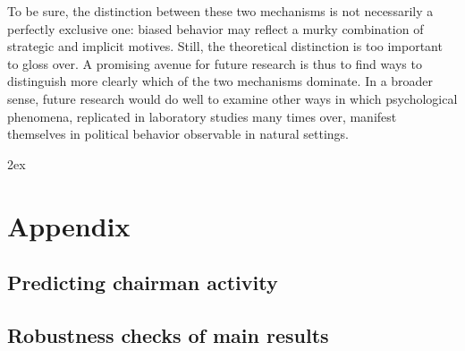 \documentclass[12pt,a4paper]{article}
\begin{document}
To be sure, the distinction between these two mechanisms is not necessarily a perfectly exclusive one: biased behavior may reflect a murky combination of strategic and implicit motives. Still, the theoretical distinction is too important to gloss over. A promising avenue for future research is thus to find ways to distinguish more clearly which of the two mechanisms dominate. In a broader sense, future research would do well to examine other ways in which psychological phenomena, replicated in laboratory studies many times over, manifest themselves in political behavior observable in natural settings.



\newpage
\begingroup
\parindent 0pt
\parskip 2ex
\def\enotesize{\normalsize}
\endgroup

\clearpage






\appendix

\section{Appendix}

\subsection{Predicting chairman activity}\label{appact}



\clearpage
\subsection{Robustness checks of main results}\label{approbust}




\end{document}
